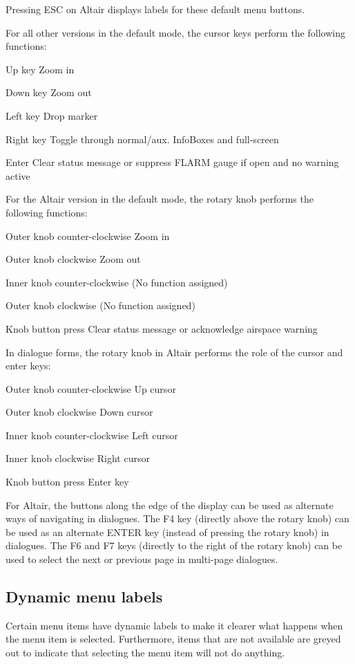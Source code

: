 Pressing ESC on Altair displays labels for these default menu buttons.

For all other versions in the default mode, the cursor keys perform
the following functions:
\begin{jspecs}
\item[Up key] Zoom in
\item[Down key] Zoom out
\item[Left key] Drop marker
\item[Right key] Toggle through normal/aux. InfoBoxes and full-screen
\item[Enter] Clear status message or suppress FLARM gauge if open and no warning
active
\end{jspecs}

For the Altair version in the default mode, the rotary knob performs
the following functions:
\begin{jspecs}
\item[Outer knob counter-clockwise] Zoom in
\item[Outer knob clockwise] Zoom out
\item[Inner knob counter-clockwise] (No function assigned)
\item[Outer knob clockwise] (No function assigned)
\item[Knob button press] Clear status message or acknowledge airspace warning
\end{jspecs}

In dialogue forms, the rotary knob in Altair performs the role of the cursor and
enter keys:
\begin{jspecs}
\item[Outer knob counter-clockwise] Up cursor
\item[Outer knob clockwise] Down cursor
\item[Inner knob counter-clockwise] Left cursor
\item[Inner knob clockwise] Right cursor
\item[Knob button press] Enter key
\end{jspecs}

For Altair, the buttons along the edge of the display can be used as
alternate ways of navigating in dialogues.  The F4 key (directly above
the rotary knob) can be used as an alternate ENTER key (instead of
pressing the rotary knob) in dialogues.  The F6 and F7 keys (directly to
the right of the rotary knob) can be used to select the next or
previous page in multi-page dialogues.

\subsection*{Dynamic menu labels}
Certain menu items have dynamic labels to make it clearer what happens when the
menu item is selected.  Furthermore, items that are not available are greyed
out to indicate that selecting the menu item will not do anything.

